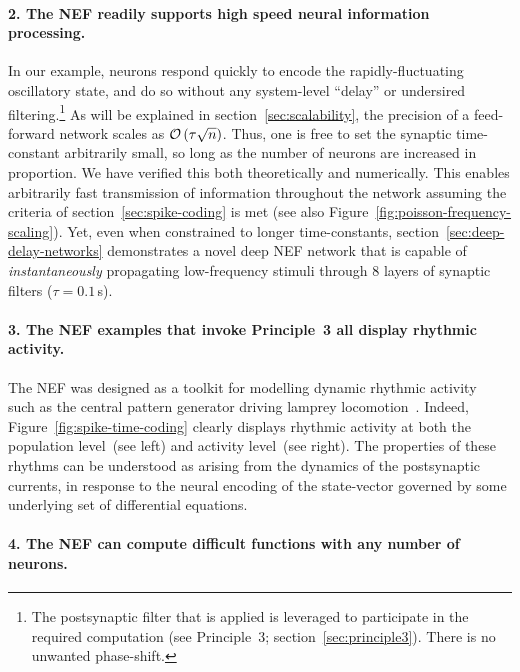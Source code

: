 \paragraph{2. The NEF readily supports high speed neural information processing.}

In our example, neurons respond quickly to encode the rapidly-fluctuating oscillatory state, and do so without any system-level ``delay'' or undersired filtering.\footnote{
The postsynaptic filter that is applied is leveraged to participate in the required computation (see Principle~3; section~\ref{sec:principle3}).
There is no unwanted phase-shift.
}
As will be explained in section~\ref{sec:scalability}, the precision of a feed-forward network scales as $\mathcal{O}\left({\tau \sqrt{n}}\right)$.
Thus, one is free to set the synaptic time-constant arbitrarily small, so long as the number of neurons are increased in proportion.
We have verified this both theoretically and numerically.
This enables arbitrarily fast transmission of information throughout the network assuming the criteria of section~\ref{sec:spike-coding} is met (see also Figure~\ref{fig:poisson-frequency-scaling}).
Yet, even when constrained to longer time-constants, section~\ref{sec:deep-delay-networks} demonstrates a novel deep NEF network that is capable of \emph{instantaneously} propagating low-frequency stimuli through 8 layers of synaptic filters ($\tau = 0.1$\,s).

\paragraph{3. The NEF examples that invoke Principle~3 all display rhythmic activity.}

The NEF was designed as a toolkit for modelling dynamic rhythmic activity~\citep{eliasmith1999developing} such as the central pattern generator driving lamprey locomotion~\citep{eliasmith2000b}.
Indeed, Figure~\ref{fig:spike-time-coding} clearly displays rhythmic activity at both the population level~(see left) and activity level~(see right).
The properties of these rhythms can be understood as arising from the dynamics of the postsynaptic currents, in response to the neural encoding of the state-vector governed by some underlying set of differential equations.

\paragraph{4. The NEF can compute difficult functions with any number of neurons.}

